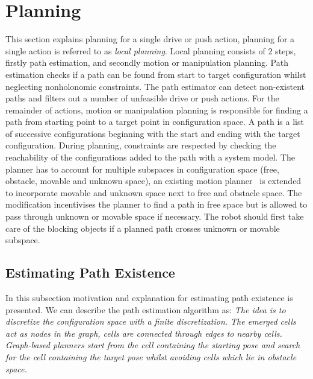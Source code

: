 \section{Planning}%
\label{sec:planning}
This section explains planning for a single drive or push action, planning for a single action is referred to as \textit{local planning}. Local planning consists of 2 steps, firstly path estimation, and secondly motion or manipulation planning. Path estimation checks if a path can be found from start to target configuration whilst neglecting nonholonomic constraints. The path estimator can detect non-existent paths and filters out a number of unfeasible drive or push actions. For the remainder of actions, motion or manipulation planning is responsible for finding a path from starting point to a target point in configuration space. A path is a list of successive configurations beginning with the start and ending with the target configuration. During planning, constraints are respected by checking the reachability of the configurations added to the path with a system model. The planner has to account for multiple subspaces in configuration space (free, obstacle, movable and unknown space), an existing motion planner~\cite{chen_fast_2018} is extended to incorporate movable and unknown space next to free and obstacle space. The modification incentivises the planner to find a path in free space but is allowed to pass through unknown or movable space if necessary. The robot should first take care of the blocking objects if a planned path crosses unknown or movable subspace.\bs

\subsection{Estimating Path Existence}%
In this subsection motivation and explanation for estimating path existence is presented. We can describe the path estimation algorithm as: \textit{The idea is to discretize the configuration space with a finite discretization. The emerged cells act as nodes in the graph, cells are connected through edges to nearby cells. Graph-based planners start from the cell containing the starting pose and search for the cell containing the target pose whilst avoiding cells which lie in obstacle space.\bs}


